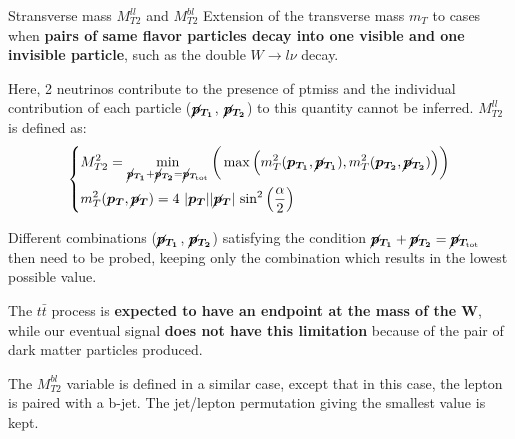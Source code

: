 \documentclass[8pt]{beamer}
\begin{document}
\begin{frame}{Stransverse mass $M_{T2}^{ll}$ and $M_{T2}^{bl}$}
\justifying
Extension of the transverse mass $m_T$ to cases when \textbf{pairs of same flavor particles decay into one visible and one invisible particle}, such as the double $W \rightarrow l\nu$ decay. \vfill

Here, 2 neutrinos contribute to the presence of ptmiss and the individual contribution of each particle ($\bm{\cancel{p}_{T_{1}}}$, $\bm{\cancel{p}_{T_2}}$) to this quantity cannot be inferred. $M_{T2}^{ll}$ is defined as:
\begin{equation*}
\begin{dcases}
M_{T2}^2 = \min_{\bm{\cancel{p}_{T_{1}}} + \bm{\cancel{p}_{T_{2}}} = \bm{\cancel{p}_{T_{\text{tot}}}}} \bigg (\max \Big (m_T^2(\bm{p_{T_1}}, \bm{\cancel{p}_{T_{1}}}), m_T^2(\bm{p_{T_2}}, \bm{\cancel{p}_{T_{2}}}) \Big ) \bigg ) \\
m_T^2(\bm{p_{T}}, \bm{\cancel{p}_{T}}) = 4 \text{ } |\bm{p_{T}}| |\bm{\cancel{p}_{T}}| \text{ sin}^2 \left (\frac{\alpha}{2} \right ) 
\end{dcases}
\end{equation*} \vfill

Different combinations ($\bm{\cancel{p}_{T_{1}}}$, $\bm{\cancel{p}_{T_{2}}}$) satisfying the condition $\bm{\cancel{p}_{T_{1}}} + \bm{\cancel{p}_{T_{2}}} = \bm{\cancel{p}_{T_{\text{tot}}}}$ then need to be probed, keeping only the combination which results in the lowest possible value. \vfill

The $t \bar t$ process is \textbf{expected to have an endpoint at the mass of the W}, while our eventual signal \textbf{does not have this limitation} because of the pair of dark matter particles produced. \vfill

The \alert{$M_{T2}^{bl}$ variable} is defined in a similar case, except that in this case, the lepton is paired with a b-jet. The jet/lepton permutation giving the smallest value is kept. \vfill
\end{frame}
\end{document}
